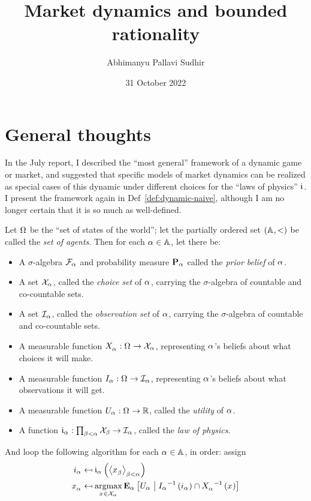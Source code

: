 \documentclass{article}
\title{Market dynamics and bounded rationality}
\author{Abhimanyu Pallavi Sudhir}
\date{31 October 2022}
\begin{document}
\maketitle

\section{General thoughts}

In the July report, I described the ``most general'' framework of a dynamic game or market, and suggested that specific models of market dynamics can be realized as special cases of this dynamic under different choices for the ``laws of physics'' $\info$. I present the framework again in Def~\ref{def:dynamic-naive}, although I am no longer certain that it is so much as well-defined.

\begin{definition}\label{def:dynamic-naive}
Let $\OUTCOME$ be the ``set of states of the world''; let the partially ordered set $(\AGENT, <)$ be called the \emph{set of agents}. Then for each $\agent\in\AGENT$, let there be:

\begin{itemize}
    \item A $\sigma$-algebra $\EVENT[\agent]$ and probability measure $\PRO[\agent]$ called the \emph{prior belief} of $\agent$.
    \item A set $\CHOICE[\agent]$, called the \emph{choice set} of $\agent$, carrying the $\sigma$-algebra of countable and co-countable sets. 
    \item A set $\OBS[\agent]$, called the \emph{observation set} of $\agent$, carrying the $\sigma$-algebra of countable and co-countable sets.
    \item A measurable function $\Choice[\agent]:\OUTCOME\to\CHOICE[\agent]$, representing $\agent$'s beliefs about what choices it will make. 
    \item A measurable function $\Obs[\agent]:\OUTCOME\to\OBS[\agent]$, representing $\agent$'s beliefs about what observations it will get.
    \item A measurable function $\Utility[\agent]:\OUTCOME\to\R$, called the \emph{utility} of $\agent$.
    \item A function $\info[\agent]:\prod_{\agentb<\agent}{\CHOICE[\agentb]}\to\OBS[\agent]$, called the \emph{law of physics}.
\end{itemize}

And loop the following algorithm for each $\agent\in\AGENT$, in order: assign 
\begin{align*}
    \obs[\agent] &\assign
    \info[\agent] 
    \bra{\tup{\choice[\agentb]}[\agentb<\agent]} \\
    \choice[\agent] &\assign
    \argmax_{\choice\in\CHOICE[\agent]}
    {
        \Exp[\agent]\ope{
            \Utility[\agent]\con
                \inv{\Obs[\agent]}\bra{\obs[\agent]} \cap
                \inv{\Choice[\agent]}\bra{\choice}
        }
    }
\end{align*} 
\end{definition}
\end{document}
